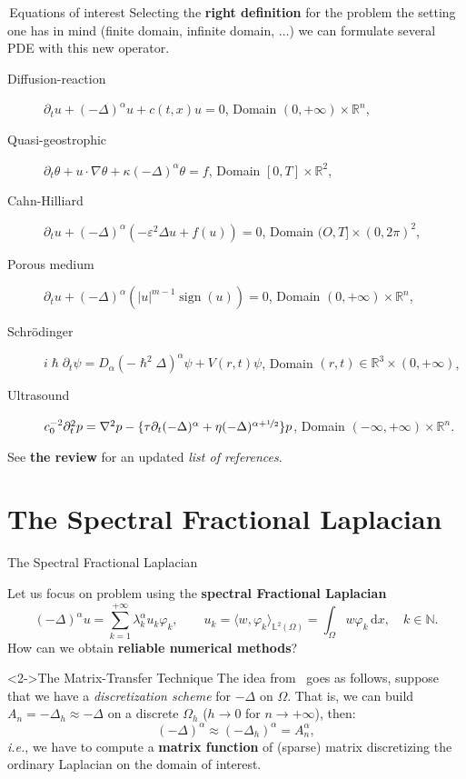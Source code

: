 \documentclass[aspectratio=169,xcolor=dvipsnames]{beamer}
\DeclareMathOperator{\sign}{sign}
\begin{document}
	\begin{frame}{\faBook\,Equations of interest}
	Selecting the \textbf{right definition} for the problem the setting one has in mind (finite domain, infinite domain, $\ldots$) we can formulate several PDE with this new operator.\vfill
	
	\begin{description}
		\item[Diffusion-reaction] $\partial_t u + (-\Delta)^\alpha u + c(t,x) u = 0$, Domain $(0,+\infty) \times \mathbb{R}^n$, 
		\item[Quasi-geostrophic] $\partial_t \theta + u \cdot \nabla \theta + \kappa (-\Delta)^\alpha \theta = f$, Domain $[0,T] \times \mathbb{R}^2$,
		\item[Cahn-Hilliard] $\partial_t u + (-\Delta)^\alpha(-\varepsilon^2 \Delta u + f(u)) = 0$, Domain $(O,T] \times (0,2\pi)^2$,
		\item[Porous medium] $\partial_t u + (-\Delta)^\alpha (|u|^{m-1} \sign(u)) = 0$, Domain $(0,+\infty) \times \mathbb{R}^n$,
		\item[Schr\"odinger] $i \hslash \partial_t \psi = D_\alpha (-\hslash^2 \Delta)^\alpha \psi + V(r,t) \psi$, Domain $(r,t) \in \mathbb{R}^3 \times (0,+\infty)$,
		\item[Ultrasound] $c_0^{-2} \partial_t^2 p = \nabla^2 p - \{\tau \partial_t (-\Delta)^\alpha + \eta (-\Delta)^{\alpha + \nicefrac{1}{2}}  \}p$, Domain $(-\infty,+\infty) \times \mathbb{R}^n$. 
	\end{description}\vfill
	
	\faEye\;See \textbf{the review} \parencite{MR4043885} for an updated \emph{list of references}.
	\end{frame}

	\section{The Spectral Fractional Laplacian}

	\begin{frame}{The Spectral Fractional Laplacian}
	
	Let us focus on problem using the \textbf{spectral Fractional Laplacian}
		\[
(-\Delta)^\alpha u = \sum_{k=1}^{+\infty} \lambda_k^\alpha u_k \varphi_k, \qquad u_k = \langle w , \varphi_k \rangle_{\mathbb{L}^2(\Omega)} = \int_{\Omega} w \varphi_k \,\mathrm{d}x, \quad k \in \mathbb{N}.
\]
	\faQuestionCircle\; How can we obtain \alert{\textbf{reliable numerical methods}}?
	
	\begin{exampleblock}<2->{\faLightbulb\;The Matrix-Transfer Technique}
	The idea from~\parencite{MR2252038,MR2300467} goes as follows, suppose that we have a \emph{discretization scheme} for $-\Delta$ on $\Omega$. That is, we can build $A_n = -\Delta_h \approx -\Delta$ on a discrete $\Omega_h$ ($h \rightarrow 0$ for $n \rightarrow +\infty$), then:
	\[
	(-\Delta)^\alpha \approx (-\Delta_h)^\alpha = A_n^\alpha,
	\]
	\emph{i.e.}, we have to compute a \textbf{matrix function} of (sparse) matrix discretizing the ordinary Laplacian on the domain of interest.
	\end{exampleblock}
	
	\end{frame}
\end{document}
